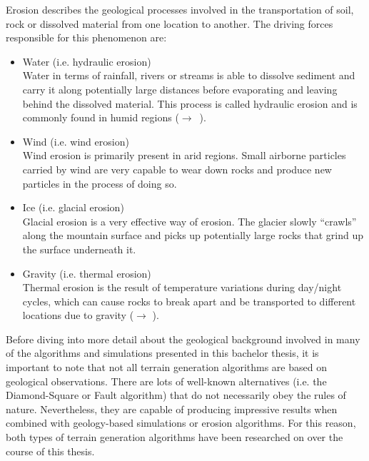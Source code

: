 \documentclass[11pt,a4paper,twoside,openright]{report}
\begin{document}
\noindent Erosion describes the geological processes involved in the transportation of soil, rock or dissolved material from one location to another. The driving forces responsible for this phenomenon are:
\begin{itemize}
  \item Water (i.e. hydraulic erosion)
  \\
  Water in terms of rainfall, rivers or streams is able to dissolve sediment and carry it along potentially large distances before evaporating and leaving behind the dissolved material. This process is called hydraulic erosion and is commonly found in humid regions (\mbox{$\rightarrow$ }).
  \item Wind (i.e. wind erosion)
  \\
  Wind erosion is primarily present in arid regions. Small airborne particles carried by wind are very capable to wear down rocks and produce new particles in the process of doing so.
  \item Ice (i.e. glacial erosion)
  \\
  Glacial erosion is a very effective way of erosion. The glacier slowly ``crawls'' along the mountain surface and picks up potentially large rocks that grind up the surface underneath it.
  \item Gravity (i.e. thermal erosion)
  \\
  Thermal erosion is the result of temperature variations during day/night cycles, which can cause rocks to break apart and be transported to different locations due to gravity ($\rightarrow$ ).
\end{itemize}

\noindent Before diving into more detail about the geological background involved in many of the algorithms and simulations presented in this bachelor thesis, it is important to note that not all terrain generation algorithms are based on geological observations. There are lots of well-known alternatives (i.e. the Diamond-Square or Fault algorithm) that do not necessarily obey the rules of nature. Nevertheless, they are capable of producing impressive results when combined with geology-based simulations or erosion algorithms. For this reason, both types of terrain generation algorithms have been researched on over the course of this thesis.

\end{document}
